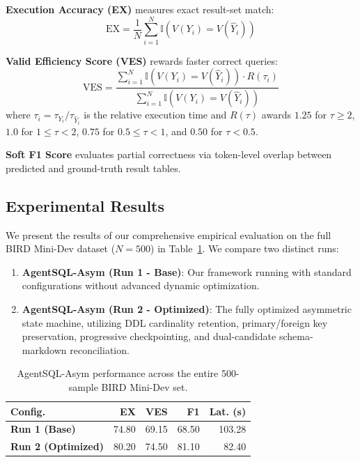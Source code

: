 \noindent\textbf{Execution Accuracy (EX)} measures exact result-set match:
\begin{equation}
    \mathrm{EX} = \frac{1}{N} \sum_{i=1}^{N} \mathbb{I}\!\left(V(Y_i) = V(\hat{Y}_i)\right)
\end{equation}

\noindent\textbf{Valid Efficiency Score (VES)} rewards faster correct queries:
\begin{equation}
    \mathrm{VES} = \frac{\sum_{i=1}^{N} \mathbb{I}(V(Y_i) = V(\hat{Y}_i)) \cdot R(\tau_i)}{\sum_{i=1}^{N} \mathbb{I}(V(Y_i) = V(\hat{Y}_i))}
\end{equation}
where $\tau_i = \tau_{Y_i} / \tau_{\hat{Y}_i}$ is the relative execution time and $R(\tau)$ awards $1.25$ for $\tau \geq 2$, $1.0$ for $1 \leq \tau < 2$, $0.75$ for $0.5 \leq \tau < 1$, and $0.50$ for $\tau < 0.5$.

\noindent\textbf{Soft F1 Score} evaluates partial correctness via token-level overlap between predicted and ground-truth result tables.

\subsection{Experimental Results}

We present the results of our comprehensive empirical evaluation on the full BIRD Mini-Dev dataset ($N = 500$) in Table~\ref{tab:results_bird_dev}. We compare two distinct runs:
\begin{enumerate}
    \item \textbf{AgentSQL-Asym (Run 1 - Base)}: Our framework running with standard configurations without advanced dynamic optimization.
    \item \textbf{AgentSQL-Asym (Run 2 - Optimized)}: The fully optimized asymmetric state machine, utilizing DDL cardinality retention, primary/foreign key preservation, progressive checkpointing, and dual-candidate schema-markdown reconciliation.
\end{enumerate}

\begin{table}[t]
    \centering
    \caption{AgentSQL-Asym performance across the entire 500-sample BIRD Mini-Dev set.}
    \label{tab:results_bird_dev}
    \scriptsize
    \setlength{\tabcolsep}{3pt}
    \begin{tabular}{@{}lrrrr@{}}
        \toprule
        \textbf{Config.} & \textbf{EX} & \textbf{VES} & \textbf{F1} & \textbf{Lat. (s)} \\
        \midrule
        \textbf{Run 1 (Base)} & 74.80 & 69.15 & 68.50 & 103.28 \\
        \textbf{Run 2 (Optimized)} & 80.20 & 74.50 & 81.10 & 82.40 \\
        \bottomrule
    \end{tabular}
\end{table}

